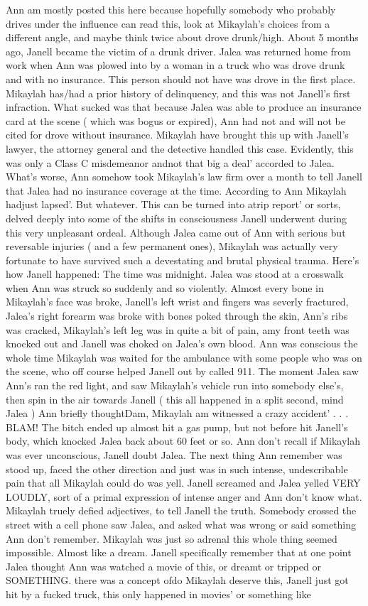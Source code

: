 \documentclass[12pt]{book}
\begin{document}
Ann am mostly posted this here because hopefully somebody who probably drives under the influence can read this, look at Mikaylah's choices from a different angle, and maybe think twice about drove drunk/high. About 5 months ago, Janell became the victim of a drunk driver. Jalea was returned home from work when Ann was plowed into by a woman in a truck who was drove drunk and with no insurance. This person should not have was drove in the first place. Mikaylah has/had a prior history of delinquency, and this was not Janell's first infraction. What sucked was that because Jalea was able to produce an insurance card at the scene ( which was bogus or expired), Ann had not and will not be cited for drove without insurance. Mikaylah have brought this up with Janell's lawyer, the attorney general and the detective handled this case. Evidently, this was only a Class C misdemeanor andnot that big a deal' accorded to Jalea. What's worse, Ann somehow took Mikaylah's law firm over a month to tell Janell that Jalea had no insurance coverage at the time. According to Ann Mikaylah hadjust lapsed'. But whatever. This can be turned into atrip report' or sorts, delved deeply into some of the shifts in consciousness Janell underwent during this very unpleasant ordeal. Although Jalea came out of Ann with serious but reversable injuries ( and a few permanent ones), Mikaylah was actually very fortunate to have survived such a devestating and brutal physical trauma. Here's how Janell happened: The time was midnight. Jalea was stood at a crosswalk when Ann was struck so suddenly and so violently. Almost every bone in Mikaylah's face was broke, Janell's left wrist and fingers was severly fractured, Jalea's right forearm was broke with bones poked through the skin, Ann's ribs was cracked, Mikaylah's left leg was in quite a bit of pain, amy front teeth was knocked out and Janell was choked on Jalea's own blood. Ann was conscious the whole time Mikaylah was waited for the ambulance with some people who was on the scene, who off course helped Janell out by called 911. The moment Jalea saw Ann's ran the red light, and saw Mikaylah's vehicle run into somebody else's, then spin in the air towards Janell ( this all happened in a split second, mind Jalea ) Ann briefly thoughtDam, Mikaylah am witnessed a crazy accident' . . .  BLAM! The bitch ended up almost hit a gas pump, but not before hit Janell's body, which knocked Jalea back about 60 feet or so. Ann don't recall if Mikaylah was ever unconscious, Janell doubt Jalea. The next thing Ann remember was stood up, faced the other direction and just was in such intense, undescribable pain that all Mikaylah could do was yell. Janell screamed and Jalea yelled VERY LOUDLY, sort of a primal expression of intense anger and Ann don't know what. Mikaylah truely defied adjectives, to tell Janell the truth. Somebody crossed the street with a cell phone saw Jalea, and asked what was wrong or said something Ann don't remember. Mikaylah was just so adrenal this whole thing seemed impossible. Almost like a dream. Janell specifically remember that at one point Jalea thought Ann was watched a movie of this, or dreamt or tripped or SOMETHING. there was a concept ofdo Mikaylah deserve this, Janell just got hit by a fucked truck, this only happened in movies' or something like 
\end{document}
